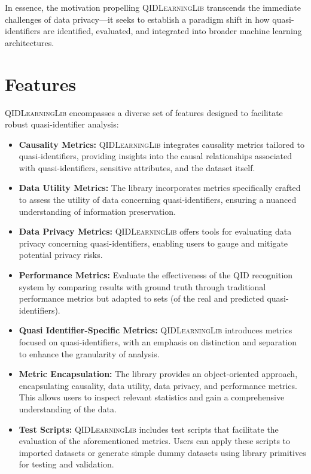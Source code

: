 \documentclass[twoside,11pt]{article}
\begin{document}
In essence, the motivation propelling \textsc{QIDLearningLib} transcends the immediate challenges of data privacy—it seeks to establish a paradigm shift in how quasi-identifiers are identified, evaluated, and integrated into broader machine learning architectures.

\section{Features}

\textsc{QIDLearningLib} encompasses a diverse set of features designed to facilitate robust quasi-identifier analysis:

\begin{itemize}
    \item \textbf{Causality Metrics:} \textsc{QIDLearningLib} integrates causality metrics tailored to quasi-identifiers, providing insights into the causal relationships associated with quasi-identifiers, sensitive attributes, and the dataset itself.
    
    \item \textbf{Data Utility Metrics:} The library incorporates metrics specifically crafted to assess the utility of data concerning quasi-identifiers, ensuring a nuanced understanding of information preservation.
    
    \item \textbf{Data Privacy Metrics:} \textsc{QIDLearningLib} offers tools for evaluating data privacy concerning quasi-identifiers, enabling users to gauge and mitigate potential privacy risks.
    
    \item \textbf{Performance Metrics:} Evaluate the effectiveness of the QID recognition system by comparing results with ground truth through traditional performance metrics but adapted to sets (of the real and predicted quasi-identifiers).
    
    \item \textbf{Quasi Identifier-Specific Metrics:} \textsc{QIDLearningLib} introduces metrics focused on quasi-identifiers, with an emphasis on distinction and separation to enhance the granularity of analysis.
    
    \item \textbf{Metric Encapsulation:} The library provides an object-oriented approach, encapsulating causality, data utility, data privacy, and performance metrics. This allows users to inspect relevant statistics and gain a comprehensive understanding of the data.
    
    \item \textbf{Test Scripts:} \textsc{QIDLearningLib} includes test scripts that facilitate the evaluation of the aforementioned metrics. Users can apply these scripts to imported datasets or generate simple dummy datasets using library primitives for testing and validation.
    
\end{itemize}
\end{document}
